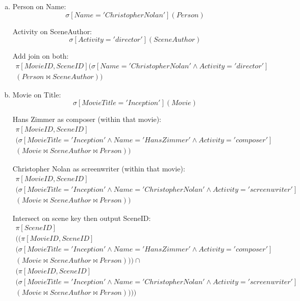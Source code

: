 \documentclass{article}
\begin{document}
\task{}
\begin{enumerate}[(a)]
\item
Person on Name:
\begin{equation}
\sigma\left[Name='Christopher Nolan'\right](Person)
\end{equation}

Activity on SceneAuthor:
\begin{equation}
\sigma\left[Activity='director'\right](SceneAuthor)
\end{equation}

Add join on both:
\begin{multline}
\pi\left[MovieID,SceneID\right](\sigma\left[Name='Christopher Nolan' \land Activity='director'\right]\\
 (Person \Join SceneAuthor))
\end{multline}

\item
Movie on Title:
\begin{equation}
\sigma[MovieTitle='Inception'](Movie)
\end{equation}

Hans Zimmer as composer (within that movie):
\begin{multline}
\pi\left[MovieID,SceneID\right]\\
 (\sigma\left[MovieTitle='Inception' \land Name='Hans Zimmer' \land Activity='composer'\right]\\
 (Movie \Join SceneAuthor \Join Person))
\end{multline}

Christopher Nolan as screenwriter (within that movie):
\begin{multline}
\pi\left[MovieID,SceneID\right]\\
 (\sigma\left[MovieTitle='Inception' \land Name='Christopher Nolan' \land Activity='screenwriter'\right]\\
 (Movie \Join SceneAuthor \Join Person))
\end{multline}

Intersect on scene key then output SceneID:
\begin{multline}
\pi\left[SceneID\right]\\
((\pi\left[MovieID,SceneID\right]\\
 (\sigma\left[MovieTitle='Inception' \land Name='Hans Zimmer' \land Activity='composer'\right]\\
 (Movie \Join SceneAuthor \Join Person))) \cap \\
 (\pi\left[MovieID,SceneID\right]\\
 (\sigma\left[MovieTitle='Inception' \land Name='Christopher Nolan' \land Activity='screenwriter'\right]\\
 (Movie \Join SceneAuthor \Join Person))))
\end{multline}


\end{enumerate}
\end{document}
